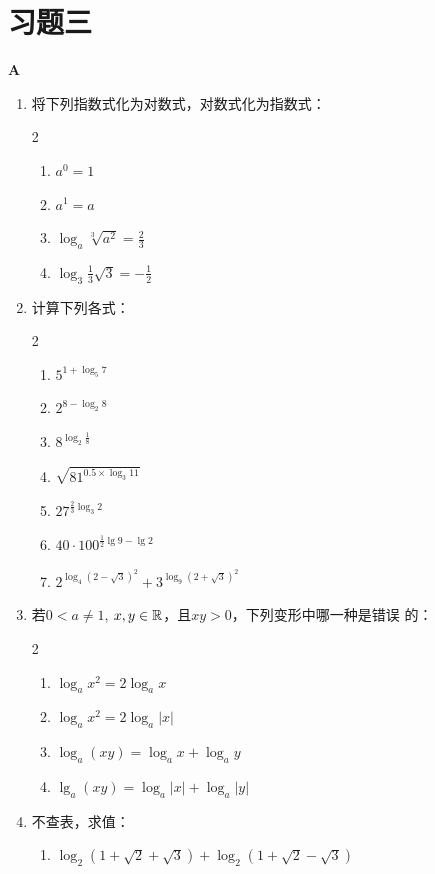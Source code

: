 \section*{习题三}
\begin{center}
    \bfseries A
\end{center}
\begin{enumerate}
    \item 将下列指数式化为对数式，对数式化为指数式：
\begin{multicols}{2}
\begin{enumerate}[(1)]
    \item $a^0=1$
    \item $a^1=a$
    \item $\log_a\sqrt[3]{a^2}=\frac{2}{3}$
    \item $\log_3\frac{1}{3}\sqrt{3}=-\frac{1}{2}$
\end{enumerate}
\end{multicols}
    \item 计算下列各式：
\begin{multicols}{2}
\begin{enumerate}[(1)]
    \item $5^{1+\log_5 7}$
    \item $2^{8-\log_2 8}$
    \item $8^{\log_2\tfrac{1}{8}}$
    \item $\sqrt{81^{0.5\times \log_3 11}}$
    \item $27^{\tfrac{2}{3}\log_3 2}$
    \item $40\cdot 100^{\tfrac{1}{2}\lg 9-\lg 2}$
    \item $2^{\log_4\left(2-\sqrt{3}\right)^2}+3^{\log_9\left(2+\sqrt{3}\right)^2}$
\end{enumerate}
\end{multicols}
    \item 若$0<a\ne 1$, $x,y\in\mathbb{R}$，且$xy>0$，下列变形中哪一种是错误
的：
\begin{multicols}{2}
    \begin{enumerate}[(1)]
\item $\log_a x^2=2\log_a x$
\item $\log_a x^2 = 2\log_a |x|$
\item $\log_a (xy)=\log_a x+\log_a y$
\item $\lg_a (xy)=\log_a|x|+ \log_a|y| $
    \end{enumerate}
\end{multicols}
\item 不查表，求值：
    \begin{enumerate}[(1)]
\item $\log_2 (1+\sqrt{2}+\sqrt{3})+\log_2 (1+\sqrt{2}-\sqrt{3})$
    \end{enumerate}


\end{enumerate}
